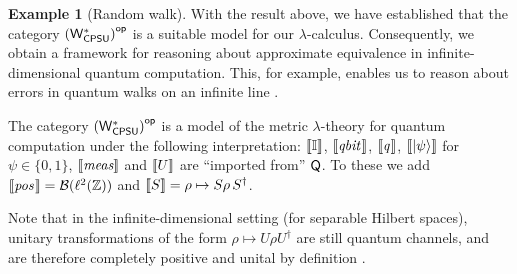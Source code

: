 \documentclass[10pt,a4paper]{amsart}
\theoremstyle{definition}
\theoremstyle{definition}
\newtheorem{example}[definition]{Example}
\theoremstyle{definition}
\theoremstyle{definition}
\theoremstyle{definition}
\theoremstyle{definition}
\begin{document}
\begin{example}[Random walk]
With the result above, we have established that the category $\left(\mathsf{W^*_{CPSU}}\right)^{\mathsf{op}}$ is a suitable model for our $\lambda$-calculus. Consequently, we obtain a framework for reasoning about approximate equivalence in infinite-dimensional quantum computation. This, for example, enables us to reason about errors in quantum walks on an infinite line \cite{venegasQuantumWalksComprehensive2012}.

The category  $\left(\mathsf{W^*_{CPSU}}\right)^{\mathsf{op}}$ is a model of the metric $\lambda$-theory for quantum computation under the following interpretation: 
$\left \llbracket \mathbb{I} \right \rrbracket$, 
$\left \llbracket \emph{qbit} \hspace{1pt} \right \rrbracket$, $\left \llbracket \emph{q} \hspace{1pt} \right \rrbracket$, $\left \llbracket \ket{\psi} \right \rrbracket$ for $\psi \in \{0, 1\}$, $\left \llbracket \emph{meas} \right \rrbracket$ and $\left \llbracket U \right \rrbracket$ are ``imported from'' $\mathsf{Q}$. To these we add $\left \llbracket \emph{pos} \hspace{1pt} \right \rrbracket= \mathcal{B}(\ell^2(\mathbb{Z}))$ and $\left \llbracket S \right \rrbracket= \rho \mapsto S \rho \, S^\dag$.

Note that in the infinite-dimensional setting (for separable Hilbert spaces), unitary transformations of the form $\rho \mapsto U \rho U^\dag$ are still quantum channels, and are therefore completely positive and unital by definition \cite[Example~4.6, Definition~1.48]{heinosaariMathematicalLanguageQuantum2011}. 


\end{example}
\end{document}
